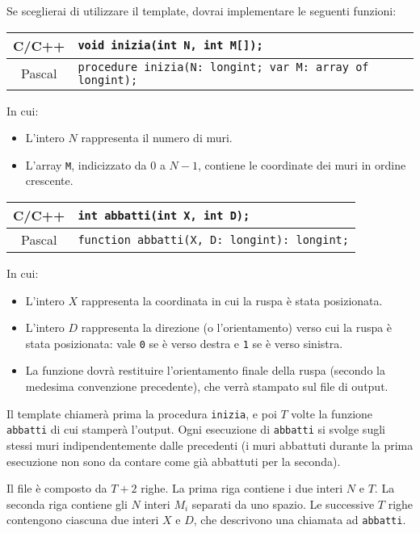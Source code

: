 Se sceglierai di utilizzare il template, dovrai implementare le seguenti funzioni:
\begin{center}\begin{tabularx}{\textwidth}{|c|X|}
\hline
C/C++  & \verb|void inizia(int N, int M[]);|\\
\hline
Pascal & \verb|procedure inizia(N: longint; var M: array of longint);|\\
\hline
\end{tabularx}\end{center}
In cui:
\begin{itemize}[nolistsep]
  \item L'intero $N$ rappresenta il numero di muri.
  \item L'array \texttt{M}, indicizzato da $0$ a $N-1$, contiene le coordinate dei muri in ordine crescente.
\end{itemize}

\begin{center}\begin{tabularx}{\textwidth}{|c|X|}
\hline
C/C++  & \verb|int abbatti(int X, int D);|\\
\hline
Pascal & \verb|function abbatti(X, D: longint): longint;|\\
\hline
\end{tabularx}\end{center}
In cui:
\begin{itemize}[nolistsep]
  \item L'intero $X$ rappresenta la coordinata in cui la ruspa \`e stata posizionata.
  \item L'intero $D$ rappresenta la direzione (o l'orientamento) verso cui la ruspa \`e stata posizionata: vale \texttt{0} se è verso destra e \texttt{1} se è verso sinistra.
  \item La funzione dovrà restituire l'orientamento finale della ruspa (secondo la medesima convenzione precedente), che verrà stampato sul file di output.
\end{itemize}

Il template chiamer\`a prima la procedura \texttt{inizia}, e poi $T$ volte la funzione \texttt{abbatti} di cui stamper\`a l'output. Ogni esecuzione di \texttt{abbatti} si svolge sugli stessi muri indipendentemente dalle precedenti (i muri abbattuti durante la prima esecuzione non sono da contare come gi\`a abbattuti per la seconda).


\InputFile
Il file  è composto da $T+2$ righe. La prima riga contiene i due interi $N$ e $T$. La seconda riga contiene gli $N$ interi $M_i$ separati da uno spazio. Le successive $T$ righe contengono ciascuna due interi $X$ e $D$, che descrivono una chiamata ad \texttt{abbatti}.


